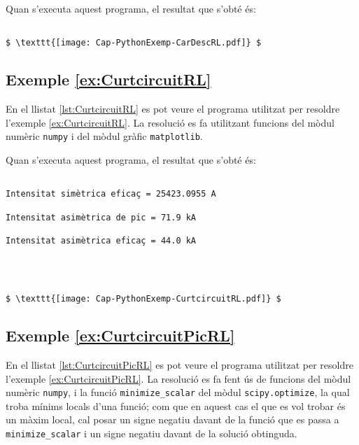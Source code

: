 Quan s'executa aquest programa, el resultat que s'obté és:
\lstset{
	language=,
	numbers=none,
	frame=none
}
\begin{lstlisting}[mathescape=true]
	
$ \texttt{[image: Cap-PythonExemp-CarDescRL.pdf]} $
\end{lstlisting}


\hypertarget{exemple:CurtcircuitRL}{\subsection{Exemple \ref*{ex:CurtcircuitRL} \CurtcircuitRL}}
En el llistat \vref{lst:CurtcircuitRL} es pot veure el programa utilitzat per resoldre l'exemple \vref{ex:CurtcircuitRL}. La resolució es fa utilitzant funcions del mòdul numèric \texttt{numpy} i del mòdul gràfic  \texttt{matplotlib}.

\pagebreak



Quan s'executa aquest programa, el resultat que s'obté és:
\lstset{
	language=,
	numbers=none,
	frame=none
}

\begin{lstlisting}[mathescape=true]
	
Intensitat simètrica eficaç = 25423.0955 A

Intensitat asimètrica de pic = 71.9 kA

Intensitat asimètrica eficaç = 44.0 kA




$ \texttt{[image: Cap-PythonExemp-CurtcircuitRL.pdf]} $
\end{lstlisting}


\hypertarget{exemple:CurtcircuitPicRL}{\subsection{Exemple \ref*{ex:CurtcircuitPicRL} \CurtcircuitPicRL}}
En el llistat \vref{lst:CurtcircuitPicRL} es pot veure el programa utilitzat per resoldre l'exemple \vref{ex:CurtcircuitPicRL}. La resolució es fa fent ús de funcions del mòdul numèric \texttt{numpy}, i la funció \texttt{minimize\_scalar} del mòdul  \texttt{scipy.optimize}, la qual troba mínims locals d'una funció; com que en aquest cas  el que es vol trobar és un màxim local, cal posar un signe negatiu davant de la funció que es passa a \texttt{minimize\_scalar} i un signe negatiu davant de la solució obtinguda.


